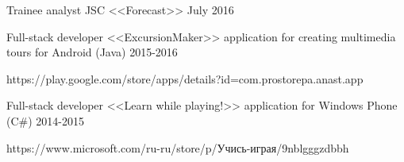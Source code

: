 \begin{cventries}

\cventrynodescription
{Trainee analyst } %
{JSC <<Forecast>>} %
{} %
{July 2016} %



\cventry
{Full-stack developer} %
{<<ExcursionMaker>> application for creating multimedia tours for Android  (Java) } %
{} %
{2015-2016} %
{ %
 \begin{cvitems}
\item {https://play.google.com/store/apps/details?id=com.prostorepa.anast.app}
 \end{cvitems}
}


\cventry
{Full-stack developer} %
{<<Learn while playing!>> application for Windows Phone  (C\#) } %
{} %
{2014-2015} %
{ %
 \begin{cvitems}
\item {https://www.microsoft.com/ru-ru/store/p/Учись-играя/9nblgggzdbbh}
 \end{cvitems}
}

\end{cventries}